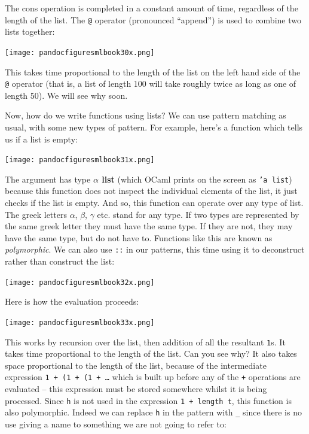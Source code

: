 \documentclass[]{book}
\newcommand{\smspace}{\vspace{4mm}}
\begin{document}
\noindent The cons operation is completed in a constant amount of time, regardless of the length of the list. The \texttt{@} operator (pronounced ``append'') is used to combine two lists together:
\medskip
\begin{center}
\noindent\texttt{[image: pandocfiguresmlbook30x.png]}
\end{center}
\medskip

\noindent This takes time proportional to the length of the list on the left hand side of the \texttt{@} operator (that is, a list of length 100 will take roughly twice as long as one of length 50). We will see why soon.

Now, how do we write functions using lists? We can use pattern matching as usual, with some new types of pattern. For example, here's a function which tells us if a list is empty:

\medskip
\begin{center}
\noindent\texttt{[image: pandocfiguresmlbook31x.png]}
\end{center}
\medskip
\smspace

\noindent The argument has type \textbf{\textsf{$\alpha$ list}} (which OCaml prints on the screen as \texttt{'a list}) because this function does not inspect the individual elements of the list, it just checks if the list is empty. And so, this function can operate over any type of list. The greek letters $\alpha$, $\beta$, $\gamma$ etc. stand for any type. If two types are represented by the same greek letter they must have the same type. If they are not, they may have the same type, but do not have to. Functions like this are known as \textit{polymorphic}. We can also use \texttt{::} in our patterns, this time using it to deconstruct rather than construct the list:

\medskip
\begin{center}
\noindent\texttt{[image: pandocfiguresmlbook32x.png]}
\end{center}
\medskip
\smspace

\noindent Here is how the evaluation proceeds: 

\medskip
\begin{center}
\noindent\texttt{[image: pandocfiguresmlbook33x.png]}
\end{center}
\medskip
\smspace

\noindent This works by recursion over the list, then addition of all the resultant \texttt{1}s. It takes time proportional to the length of the list. Can you see why? It also takes space proportional to the length of the list, because of the intermediate expression \texttt{1 + (1 + (1 + \ldots} which is built up before any of the \texttt{+} operations are evaluated -- this expression must be stored somewhere whilst it is being processed. Since \texttt{h} is not used in the expression \texttt{1 + length t}, this function is also polymorphic. Indeed we can replace \texttt{h} in the pattern with \texttt{\_} since there is no use giving a name to something we are not going to refer to:
\end{document}
